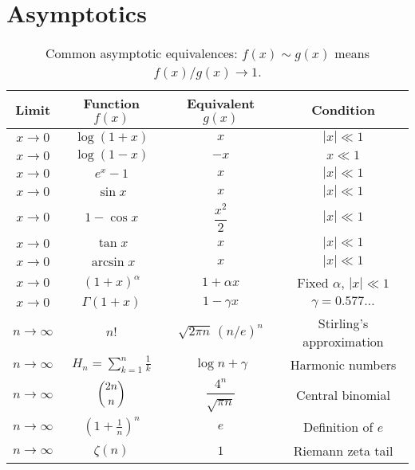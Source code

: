 \documentclass{article}
\begin{document}
\section{Asymptotics}
\begin{table}[ht]
\centering
\renewcommand{\arraystretch}{1.4}
\begin{tabular}{|c|c|c|c|}
\hline
\textbf{Limit} & \textbf{Function \(f(x)\)} & \textbf{Equivalent \(g(x)\)} & \textbf{Condition} \\
\hline
\(x \to 0\) & \(\log(1 + x)\) & \(x\) & \(|x| \ll 1\) \\
\(x \to 0\) & \(\log(1 - x)\) & \(-x\) & \(x \ll 1\) \\
\(x \to 0\) & \(e^x - 1\) & \(x\) & \(|x| \ll 1\) \\
\(x \to 0\) & \(\sin x\) & \(x\) & \(|x| \ll 1\) \\
\(x \to 0\) & \(1 - \cos x\) & \(\dfrac{x^2}{2}\) & \(|x| \ll 1\) \\
\(x \to 0\) & \(\tan x\) & \(x\) & \(|x| \ll 1\) \\
\(x \to 0\) & \(\arcsin x\) & \(x\) & \(|x| \ll 1\) \\
\(x \to 0\) & \((1 + x)^\alpha\) & \(1 + \alpha x\) & Fixed \(\alpha\), \(|x| \ll 1\) \\
\(x \to 0\) & \(\Gamma(1 + x)\) & \(1 - \gamma x\) & \(\gamma = 0.577\ldots\) \\
\hline
\(n \to \infty\) & \(n!\) & \(\sqrt{2\pi n}\,(n/e)^n\) & Stirling’s approximation \\
\(n \to \infty\) & \(H_n = \sum_{k=1}^n \frac{1}{k}\) & \(\log n + \gamma\) & Harmonic numbers \\
\(n \to \infty\) & \(\dbinom{2n}{n}\) & \(\dfrac{4^n}{\sqrt{\pi n}}\) & Central binomial \\
\(n \to \infty\) & \(\left(1 + \frac{1}{n}\right)^n\) & \(e\) & Definition of \(e\) \\
\(n \to \infty\) & \(\zeta(n)\) & \(1\) & Riemann zeta tail \\
\hline
\end{tabular}
\caption{Common asymptotic equivalences: \(f(x) \sim g(x)\) means \(f(x)/g(x) \to 1\).}
\end{table}
\end{document}
